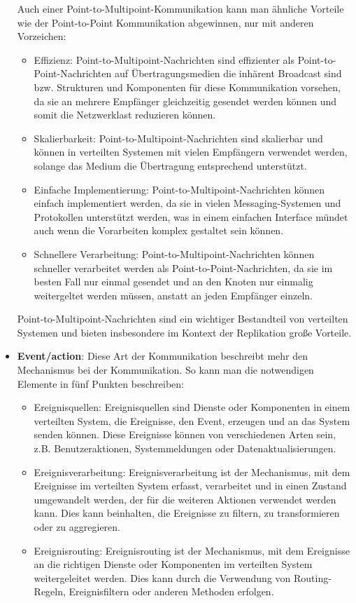 \documentclass[../vs-script-first-v01.tex]{subfiles}
\begin{document}
\begin{itemize}
Auch einer Point-to-Multipoint-Kommunikation kann man ähnliche Vorteile wie der Point-to-Point Kommunikation abgewinnen, nur mit anderen Vorzeichen:
\begin{itemize}
\item Effizienz: Point-to-Multipoint-Nachrichten sind effizienter als Point-to-Point-Nachrichten auf Übertragungsmedien die inhärent Broadcast sind bzw. Strukturen und Komponenten für diese Kommunikation vorsehen, da sie an mehrere Empfänger gleichzeitig gesendet werden können und somit die Netzwerklast reduzieren können.
\item Skalierbarkeit: Point-to-Multipoint-Nachrichten sind skalierbar und können in verteilten Systemen mit vielen Empfängern verwendet werden, solange das Medium die Übertragung entsprechend unterstützt.
\item Einfache Implementierung: Point-to-Multipoint-Nachrichten können einfach implementiert werden, da sie in vielen Messaging-Systemen und Protokollen unterstützt werden, was in einem einfachen Interface mündet auch wenn die Vorarbeiten komplex gestaltet sein können.
\item Schnellere Verarbeitung: Point-to-Multipoint-Nachrichten können schneller verarbeitet werden als Point-to-Point-Nachrichten, da sie im besten Fall nur einmal gesendet und an den Knoten nur einmalig weitergeltet werden müssen, anstatt an jeden Empfänger einzeln.
\end{itemize}
Point-to-Multipoint-Nachrichten sind ein wichtiger Bestandteil von verteilten Systemen und bieten insbesondere im Kontext der Replikation große Vorteile.
\item \textbf{Event/action}: Diese Art der Kommunikation beschreibt mehr den Mechanismus bei der Kommunikation. So kann man die notwendigen Elemente in fünf Punkten beschreiben:
\begin{itemize}
\item Ereignisquellen: Ereignisquellen sind Dienste oder Komponenten in einem verteilten System, die Ereignisse, den Event, erzeugen und an das System senden können. Diese Ereignisse können von verschiedenen Arten sein, z.B. Benutzeraktionen, Systemmeldungen oder Datenaktualisierungen.
\item Ereignisverarbeitung: Ereignisverarbeitung ist der Mechanismus, mit dem Ereignisse im verteilten System erfasst, verarbeitet und in einen Zustand umgewandelt werden, der für die weiteren Aktionen verwendet werden kann. Dies kann beinhalten, die Ereignisse zu filtern, zu transformieren oder zu aggregieren.
\item Ereignisrouting: Ereignisrouting ist der Mechanismus, mit dem Ereignisse an die richtigen Dienste oder Komponenten im verteilten System weitergeleitet werden. Dies kann durch die Verwendung von Routing-Regeln, Ereignisfiltern oder anderen Methoden erfolgen.

\end{itemize}
\end{itemize}
\end{document}
